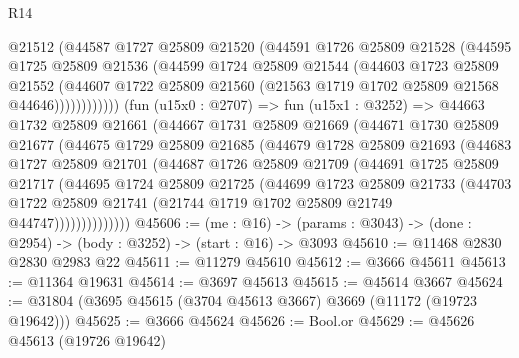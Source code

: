 \begin{lexlean}{R14}
\begin{coremodule}
                  @21512
                  (@44587
                    @1727
                    @25809
                    @21520
                    (@44591
                      @1726
                      @25809
                      @21528
                      (@44595
                        @1725
                        @25809
                        @21536
                        (@44599
                          @1724
                          @25809
                          @21544
                          (@44603
                            @1723
                            @25809
                            @21552
                            (@44607
                              @1722
                              @25809
                              @21560
                              (@21563 @1719 @1702 @25809 @21568 @44646))))))))))))
        (fun (u15x0 : @2707) =>
        fun (u15x1 : @3252) =>
        @44663
          @1732
          @25809
          @21661
          (@44667
            @1731
            @25809
            @21669
            (@44671
              @1730
              @25809
              @21677
              (@44675
                @1729
                @25809
                @21685
                (@44679
                  @1728
                  @25809
                  @21693
                  (@44683
                    @1727
                    @25809
                    @21701
                    (@44687
                      @1726
                      @25809
                      @21709
                      (@44691
                        @1725
                        @25809
                        @21717
                        (@44695
                          @1724
                          @25809
                          @21725
                          (@44699
                            @1723
                            @25809
                            @21733
                            (@44703
                              @1722
                              @25809
                              @21741
                              (@21744 @1719 @1702 @25809 @21749 @44747))))))))))))))
@45606 := (me : @16) ->
  (params : @3043) -> (done : @2954) -> (body : @3252) -> (start : @16) -> @3093
@45610 := @11468 @2830 @2830 @2983 @22
@45611 := @11279 @45610
@45612 := @3666 @45611
@45613 := @11364 @19631
@45614 := @3697 @45613
@45615 := @45614 @3667
@45624 := @31804 (@3695 @45615 (@3704 @45613 @3667) @3669 (@11172 (@19723 @19642)))
@45625 := @3666 @45624
@45626 := Bool.or
@45629 := @45626 @45613 (@19726 @19642)

\end{coremodule}
\end{lexlean}
